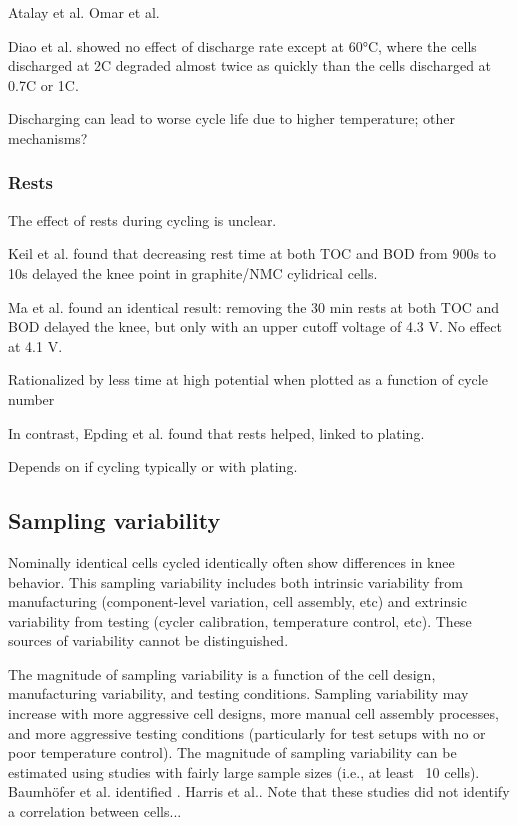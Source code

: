 \documentclass{article}
\begin{document}
Atalay et al.\cite{atalay_theory_2020}
Omar et al.

Diao et al.\cite{diao_accelerated_2019} showed no effect of discharge rate except at 60°C, where the cells discharged at 2C degraded almost twice as quickly than the cells discharged at 0.7C or 1C. 

Discharging can lead to worse cycle life due to higher temperature; other mechanisms?

\subsubsection{Rests}

The effect of rests during cycling is unclear.

Keil et al.\cite{keil_linear_2019} found that decreasing rest time at both TOC and BOD from 900s to 10s delayed the knee point in graphite/NMC cylidrical cells.

Ma et al.\cite{ma_editors_2019} found an identical result: removing the 30 min rests at both TOC and BOD delayed the knee, but only with an upper cutoff voltage of 4.3 V. No effect at 4.1 V.

Rationalized by less time at high potential when plotted as a function of cycle number

In contrast, Epding et al.\cite{epding_investigation_2019} found that rests helped, linked to plating.

Depends on if cycling typically or with plating.

\subsection{Sampling variability}

Nominally identical cells cycled identically often show differences in knee behavior. This sampling variability includes both intrinsic variability from manufacturing (component-level variation, cell assembly, etc) and extrinsic variability from testing (cycler calibration, temperature control, etc). These sources of variability cannot be distinguished.

The magnitude of sampling variability is a function of the cell design, manufacturing variability, and testing conditions. Sampling variability may increase with more aggressive cell designs, more manual cell assembly processes, and more aggressive testing conditions (particularly for test setups with no or poor temperature control). The magnitude of sampling variability can be estimated using studies with fairly large sample sizes (i.e., at least ~10 cells). Baumhöfer et al.\cite{baumhofer_production_2014} identified . Harris et al.\cite{harris_failure_2017}. Note that these studies did not identify a correlation between cells...
\end{document}
